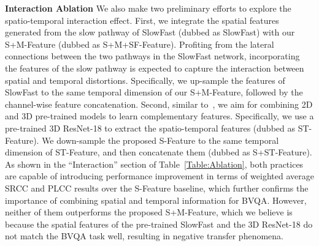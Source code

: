 \documentclass[journal]{IEEEtran}
\begin{document}
{{\textbf{Interaction Ablation} We also make two preliminary efforts to explore the spatio-temporal interaction effect. First, we integrate the spatial features generated from the slow pathway of SlowFast (dubbed as SlowFast) with our S+M-Feature (dubbed as S+M+SF-Feature). Profiting from the lateral connections between the two pathways in the SlowFast network, incorporating the features of the slow pathway is expected to capture the interaction between spatial and temporal distortions. Specifically, we up-sample the features of SlowFast to the same temporal dimension of our S+M-Feature, followed by the channel-wise feature concatenation. Second, similar to~\cite{ying2021patch}, we aim for combining 2D and 3D pre-trained models to learn complementary features. Specifically, we use a pre-trained 3D ResNet-18 \cite{hara2017learning} to extract the spatio-temporal features  (dubbed as ST-Feature). We down-sample the proposed S-Feature to the same temporal dimension of ST-Feature, and then concatenate them (dubbed as S+ST-Feature). As shown in the ``Interaction'' section of Table~\ref{Table:Ablation}, both practices are capable of introducing performance improvement in terms of weighted average SRCC and PLCC results over the S-Feature baseline, which further confirms the importance of combining spatial and temporal information for BVQA. However, neither of them outperforms the proposed S+M-Feature, which we believe is because the spatial features of the pre-trained SlowFast and the 3D ResNet-18 do not match the BVQA task well, resulting in negative transfer phenomena.

}}
\end{document}
